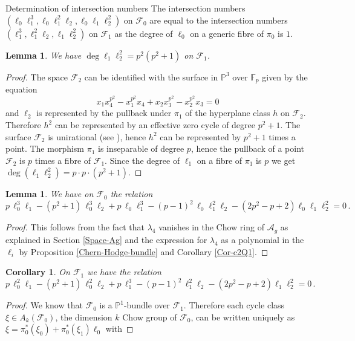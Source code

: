 \documentclass[11pt]{amsart}
\numberwithin{equation}{section}
\newcommand{\FF}{\mathbb F}
\newcommand{\PP}{\mathbb P}
\newtheorem{lemma}[theorem]{Lemma}
\newtheorem{corollary}[theorem]{Corollary}
\theoremstyle{definition}
\theoremstyle{remark}
\begin{document}
\begin{section}{Determination of intersection numbers}
The intersection numbers 
$(\ell_0\ell_1^3,  \ell_0\ell_1^2\ell_2, \ell_0\ell_1\ell_2^2)$ on $\mathcal{F}_0$
are equal to the intersection numbers 
$(\ell_1^3, \ell_1^2\ell_2, \ell_1\ell_2^2)$ on $\mathcal{F}_1$ as the degree
of $\ell_0$ on a generic fibre of $\pi_0$ is $1$.
\begin{lemma}\label{ell1ell2sq}
We have $\deg \ell_1\ell_2^2= p^2(p^2+1)$ on $\mathcal{F}_1$.
\end{lemma}
\begin{proof}
The space $\mathcal{F}_2$ can be identified with the surface in ${\PP}^3$ over
${\FF}_p$ given by the equation 
$$
x_1 x_4^{p^2}-x_1^{p^2}x_4 + x_2x_3^{p^2}-x_2^{p^2}x_3 =0 
$$
and $\ell_2$ is represented by the pullback under $\pi_1$ of the hyperplane class $h$ on 
$\mathcal{F}_2$. Therefore $h^2$
can be represented by an effective zero cycle of degree $p^2+1$. The surface
$\mathcal{F}_2$ is unirational (see \cite{K2017}), hence $h^2$ can be
represented by $p^2+1$ times a point. The morphism 
$\pi_1$ is inseparable of degree $p$, hence the pullback of
a point $\mathcal{F}_2$ is $p$ times a fibre of $\mathcal{F}_1$.
Since the degree of $\ell_1$ on a fibre of $\pi_1$ is $p$ we get
$\deg(\ell_1\ell_2^2)=p\cdot p \cdot (p^2+1)$. 
\end{proof}
\begin{lemma}\label{relation-lambda4}
We have on $\mathcal{F}_0$ the relation
$$
p\, \ell_0^3\ell_1-(p^2+1)\, \ell_0^3\ell_2 + p\, \ell_0\ell_1^3 - (p-1)^2 \, \ell_0\ell_1^2\ell_2 -
(2p^2-p+2)\ell_0\ell_1\ell_2^2
=0 \, .
$$
\end{lemma}
\begin{proof} This follows from the fact that $\lambda_4$ vanishes
in the Chow ring of $\mathcal{A}_g$ as explained in Section \ref{Space-Ag} and the expression for $\lambda_4$
as a polynomial in the $\ell_i$ by Proposition \ref{Chern-Hodge-bundle} and Corollary 
\ref{Cor-c2Q1}.
\end{proof}
\begin{corollary}\label{relation-lambda4-by ell0}
On $\mathcal{F}_1$ we have the relation
$$
p\, \ell_0^2\ell_1-(p^2+1)\, \ell_0^2\ell_2 + p\, \ell_1^3 - (p-1)^2 \, \ell_1^2\ell_2 -
(2p^2-p+2)\ell_1\ell_2^2
=0 \, .
$$
\end{corollary}
\begin{proof}
We know that $\mathcal{F}_0$ is a ${\PP}^1$-bundle over $\mathcal{F}_1$. Therefore
each cycle class $\xi \in A_k(\mathcal{F}_0)$, the dimension $k$ Chow group of $\mathcal{F}_0$, 
can be written uniquely as $\xi=\pi_{0}^*(\xi_0)+
\pi_{0}^*(\xi_1)\ell_0$ with 

\end{proof}
\end{section}
\end{document}

